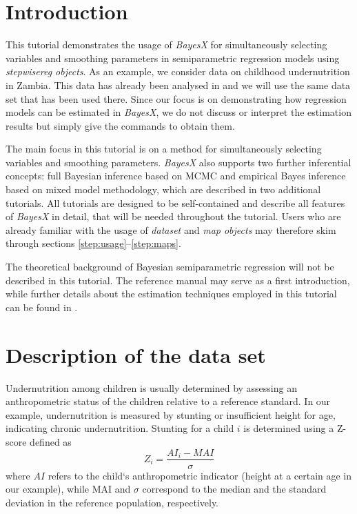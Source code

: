 \section{Introduction}

This tutorial demonstrates the usage of {\it BayesX} for
simultaneously selecting variables and smoothing parameters in
semiparametric regression models using {\it stepwisereg objects}. As
an example, we consider data on childhood undernutrition in Zambia.
This data has already been analysed in  and we
will use the same data set  that has been used there. Since our
focus is on demonstrating how regression models can be estimated in
{\it BayesX}, we do not discuss or interpret the estimation results
but simply give the commands to obtain them.

The main focus in this tutorial is on a method for simultaneously selecting variables and smoothing parameters. {\it BayesX}
also supports two further inferential concepts: full Bayesian inference based on MCMC and empirical Bayes inference based on
mixed model methodology, which are described in two additional tutorials. All tutorials are designed to be self-contained and
describe all features of {\it BayesX} in detail, that will be needed throughout the tutorial. Users who are already familiar
with the usage of {\it dataset} and {\it map objects} may therefore skim through sections \ref{step:usage}--\ref{step:maps}.

The theoretical background of Bayesian semiparametric regression will not be described in this tutorial. The reference manual
may serve as a first introduction, while further details about the estimation techniques employed in this tutorial can be found
in .

\section{Description of the data set}

Undernutrition among children is usually determined by assessing an anthropometric status of the children relative to a
reference standard. In our example, undernutrition is measured by stunting or insufficient height for age, indicating chronic
undernutrition. Stunting for a child $i$ is determined using a Z-score defined as
\[
Z_i = \frac{AI_i-MAI}{\sigma}
\]
where $AI$ refers to the child`s anthropometric indicator (height at a certain age in our example), while MAI and $\sigma$
correspond to the median and the standard deviation in the reference population, respectively.

